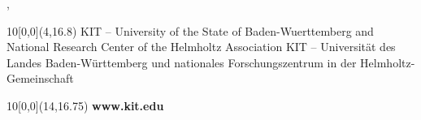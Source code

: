 \begin{titlepage}
\vspace{2cm}
\begin{center}
\large{\myplace, \timeend}
\end{center}


\begin{textblock}{10}[0,0](4,16.8)
\tiny{ 
		{KIT -- University of the State of Baden-Wuerttemberg and National Research Center of the Helmholtz Association}
		{KIT -- Universit\"at des Landes Baden-W\"urttemberg und nationales Forschungszentrum in der Helmholtz-Gemeinschaft}
}
\end{textblock}

\begin{textblock}{10}[0,0](14,16.75)
\large{
	\textbf{www.kit.edu} 
}
\end{textblock}

\end{titlepage}
